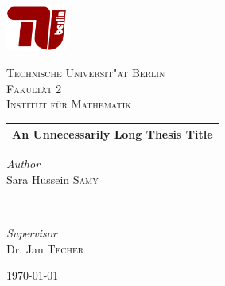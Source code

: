 \documentclass[12pt,a4paper]{article}
\theoremstyle{definition}
\theoremstyle{remark}
\begin{document}
\color{RichBlack}


\begin{titlepage}
\newcommand{\HRule}{\rule{\linewidth}{0.5mm}}
\begin{center}

\includegraphics[width=0.15\textwidth]{TU-Berlin-Logo.png}\\[1cm]
\begin{otherlanguage}{german}
\textsc{\LARGE Technische Universit"at Berlin}\\[1.5cm]
\textsc{\large Fakult\"at 2}\\[0.5cm]
\textsc{\large Institut f\"ur Mathematik}\\[0.5cm]
\end{otherlanguage}

\setlength{\aboverulesep}{10pt}
\setlength{\belowrulesep}{13pt}
\begin{tabularx}{\textwidth}{ >{\centering\arraybackslash}X}
\midrule[0.5mm]
\huge\bfseries An Unnecessarily Long Thesis Title\\
\midrule[0.5mm]
\end{tabularx}

\begin{minipage}{0.4\textwidth}
    \begin{flushleft}
        \large
        \textit{\textcolor{TUColor}{Author}}\\
        Sara Hussein \textsc{Samy}
    \end{flushleft}
\end{minipage}
~
\begin{minipage}{0.4\textwidth}
    \begin{flushright}
        \large
        \textit{\textcolor{TUColor}{Supervisor}}\\
        Dr. Jan \textsc{Techer}
    \end{flushright}
\end{minipage}

\vspace{260 pt}
{\large\today}
\end{center}
\end{titlepage}
\end{document}
